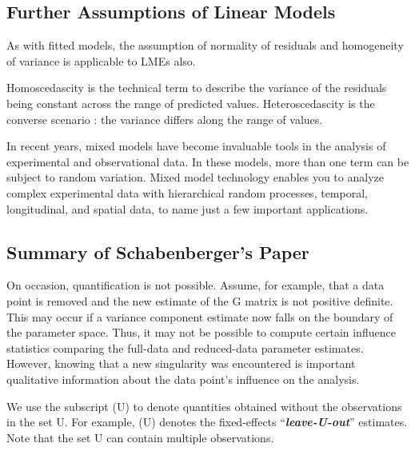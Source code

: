 \documentclass[12pt, a4paper]{article}
\begin{document}
\subsection{Further Assumptions of Linear Models}

As with fitted models, the assumption of normality of residuals and homogeneity of variance is applicable to LMEs also. 



Homoscedascity is the technical term to describe the variance of the residuals being constant across the range of predicted values.
Heteroscedascity is the converse scenario : the variance differs along the range of values.


% 
% 



In recent years, mixed models have become invaluable tools in the analysis of experimental and observational
data. In these models, more than one term can be subject to random variation. Mixed model technology enables you to analyze complex experimental data with hierarchical random processes, temporal,
longitudinal, and spatial data, to name just a few important applications. 


\subsection{Summary of Schabenberger's Paper}

On occasion, quantification is not possible. Assume, for example, that a data point is removed
and the new estimate of the G matrix is not positive definite. This may occur if a variance component
estimate now falls on the boundary of the parameter space. Thus, it may not be possible to compute certain
influence statistics comparing the full-data and reduced-data parameter estimates. However, knowing that
a new singularity was encountered is important qualitative information about the data point’s influence on
the analysis.

We use the subscript (U) to denote quantities obtained without the observations in the set U. For example,
(U) denotes the fixed-effects “\textit{\textbf{leave-U-out}}” estimates. Note that the set U can contain multiple observations.
\end{document}
